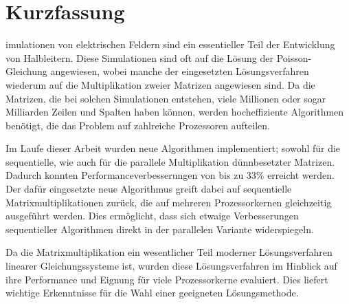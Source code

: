 %
%
%


\chapter*{Kurzfassung}




imulationen von elektrischen Feldern sind ein essentieller Teil der Entwicklung von Halbleitern. Diese Simulationen sind oft auf die Lösung der Poisson-Gleichung angewiesen, wobei manche der eingesetzten Lösungsverfahren wiederum auf die Multiplikation zweier Matrizen angewiesen sind. Da die Matrizen, die bei solchen Simulationen entstehen, viele Millionen oder sogar Milliarden Zeilen und Spalten haben können, werden hocheffiziente Algorithmen benötigt, die das Problem auf zahlreiche Prozessoren aufteilen. 

Im Laufe dieser Arbeit wurden neue Algorithmen implementiert; sowohl für die sequentielle, wie auch für die parallele Multiplikation dünnbesetzter Matrizen. Dadurch konnten Performanceverbesserungen von bis zu 33\% erreicht werden. Der dafür eingesetzte neue Algorithmus greift dabei auf sequentielle Matrixmultiplikationen zurück, die auf mehreren Prozessorkernen gleichzeitig ausgeführt werden. Dies ermöglicht, dass sich etwaige Verbesserungen sequentieller Algorithmen direkt in der parallelen Variante widerspiegeln. 

Da die Matrixmultiplikation ein wesentlicher Teil moderner Lösungsverfahren linearer Gleichungssysteme ist, wurden diese Lösungsverfahren im Hinblick auf ihre Performance und Eignung für viele Prozessorkerne evaluiert. Dies liefert wichtige Erkenntnisse für die Wahl einer geeigneten Lösungsmethode.

\clearpage